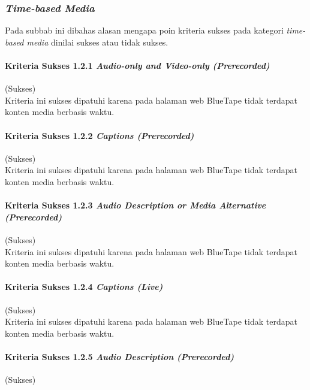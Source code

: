 \subsubsection{\textit{Time-based Media}}
\label{subsubsec:kepatuhan_bluetape_time_based_media}
Pada subbab ini dibahas alasan mengapa poin kriteria sukses pada kategori \textit{time-based media} dinilai sukses atau tidak sukses.

\paragraph{Kriteria Sukses 1.2.1 \textit{Audio-only and Video-only (Prerecorded)}}
\label{par:kepatuhan_bluetape_kriteria_sukses_1.2.1}
(Sukses)\\

Kriteria ini sukses dipatuhi karena pada halaman web BlueTape tidak terdapat konten media berbasis waktu.

\paragraph{Kriteria Sukses 1.2.2 \textit{Captions (Prerecorded)}}
\label{par:kepatuhan_bluetape_kriteria_sukses_1.2.2}
(Sukses)\\

Kriteria ini sukses dipatuhi karena pada halaman web BlueTape tidak terdapat konten media berbasis waktu.

\paragraph{Kriteria Sukses 1.2.3 \textit{Audio Description or Media Alternative (Prerecorded)}}
\label{par:kepatuhan_bluetape_kriteria_sukses_1.2.3}
(Sukses)\\

Kriteria ini sukses dipatuhi karena pada halaman web BlueTape tidak terdapat konten media berbasis waktu.

\paragraph{Kriteria Sukses 1.2.4 \textit{Captions (Live)}}
\label{par:kepatuhan_bluetape_kriteria_sukses_1.2.4}
(Sukses)\\

Kriteria ini sukses dipatuhi karena pada halaman web BlueTape tidak terdapat konten media berbasis waktu.

\paragraph{Kriteria Sukses 1.2.5 \textit{Audio Description (Prerecorded)}}
\label{par:kepatuhan_bluetape_kriteria_sukses_1.2.5}
(Sukses)\\


